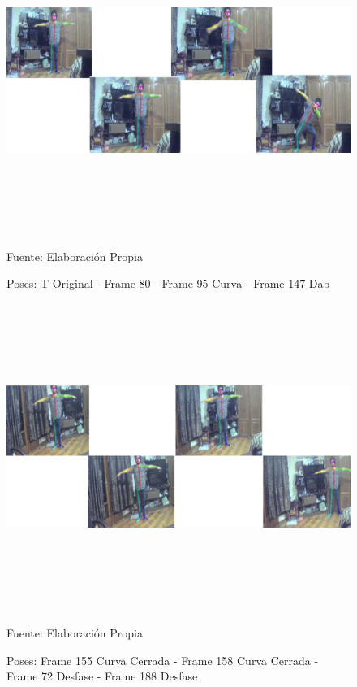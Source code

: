 \begin{figure}[ht]
	\centering
	\includegraphics[width=16cm,height=10cm,]{./Images/checkerpart1.png}
	\caption{Poses: T Original - Frame 80 - Frame 95 Curva - Frame 147 Dab}
	\footnotesize Fuente: Elaboración Propia
	\label{checker1}
\end{figure}

\begin{figure}[ht]
	\centering
	\includegraphics[width=16cm,height=10cm]{./Images/checkerpart2.png}
	\caption{Poses: Frame 155 Curva Cerrada - Frame 158 Curva Cerrada - Frame 72 Desfase - Frame 188 Desfase}
	\footnotesize Fuente: Elaboración Propia
	\label{checker2}
\end{figure}

